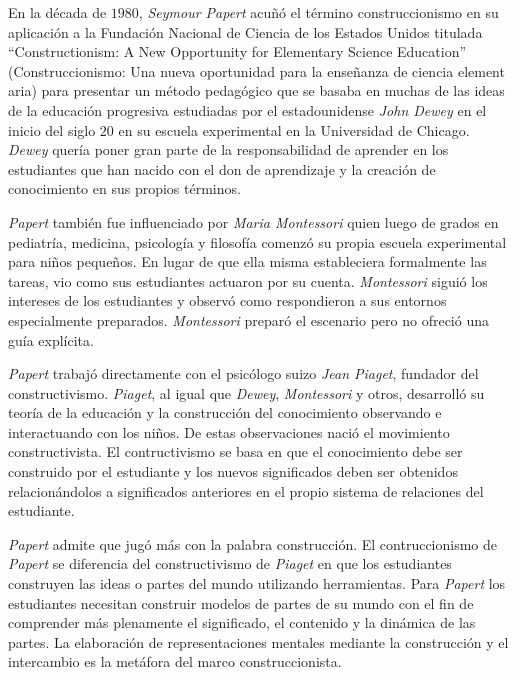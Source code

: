 En la década de $1980$, \textit{Seymour Papert} acuñó el término
construccionismo en su aplicación a la Fundación Nacional de Ciencia de los
Estados Unidos titulada \enquote{Constructionism: A New Opportunity for
    Elementary Science Education} (Construccionismo:
Una nueva oportunidad para la enseñanza de ciencia element aria) para presentar
un método pedagógico que se basaba en muchas de las ideas de la educación
progresiva estudiadas por el estadounidense \textit{John Dewey} en el inicio del
siglo $20$ en su escuela experimental en la Universidad de Chicago.
\textit{Dewey} quería poner gran parte de la responsabilidad de aprender en los
estudiantes que han nacido con el don de aprendizaje y la creación de
conocimiento en sus propios términos\cite{historia:2014}.


\textit{Papert} también fue influenciado por \textit{Maria Montessori} quien
luego de grados en pediatría, medicina, psicología y filosofía comenzó su propia
escuela experimental para niños pequeños. En lugar de que ella misma
estableciera formalmente las tareas, vio como sus estudiantes actuaron por su
cuenta. \textit{Montessori} siguió los intereses de los estudiantes y observó como
respondieron a sus entornos especialmente preparados. \textit{Montessori}
preparó el escenario pero no ofreció una guía explícita\cite{historia:2014}.

\textit{Papert} trabajó directamente con el psicólogo suizo \textit{Jean
    Piaget}, fundador del constructivismo. \textit{Piaget}, al igual que
\textit{Dewey}, \textit{Montessori} y otros, desarrolló su teoría de la
educación y la construcción del conocimiento observando e interactuando con los
niños. De estas observaciones nació el movimiento constructivista. El
contructivismo se basa en que el conocimiento debe ser construido por el
estudiante y los nuevos significados deben ser obtenidos relacionándolos a
significados anteriores en el propio sistema de relaciones del
estudiante\cite{historia:2014}. 

\textit{Papert} admite que jugó más con la palabra construcción. El
contruccionismo de \textit{Papert} se diferencia del constructivismo de
\textit{Piaget} en que los estudiantes construyen las ideas o partes del mundo
utilizando herramientas. Para \textit{Papert} los estudiantes necesitan
construir modelos de partes de su mundo con el fin de comprender más plenamente
el significado, el contenido y la dinámica de las partes. La elaboración de
representaciones mentales mediante la construcción y el intercambio es la
metáfora del marco construccionista\cite{historia:2014}.

